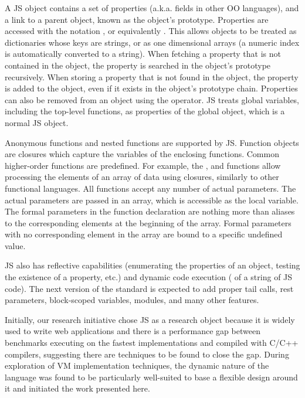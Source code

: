 A JS object contains a set of properties (a.k.a. fields in other OO languages),
and a link to a parent object, known as the object's prototype. Properties are
accessed with the notation , or equivalently .
This allows objects to be treated as dictionaries whose keys are strings, or as
one dimensional arrays (a numeric index is automatically converted to a
string).  When fetching a property that is not contained in the object, the
property is searched in the object's prototype recursively. When storing a
property that is not found in the object, the property is added to the object,
even if it exists in the object’s prototype chain. Properties can also be
removed from an object using the  operator. JS treats global
variables, including the top-level functions, as properties of the global
object, which is a normal JS object.

Anonymous functions and nested functions are supported by JS. Function objects
are closures which capture the variables of the enclosing functions. Common
higher-order functions are predefined. For example, the , 
and  functions allow processing the elements of an array of data
using closures, similarly to other functional languages. All functions accept
any number of actual parameters. The actual parameters are passed in an array,
which is accessible as the  local variable. The formal parameters
in the function declaration are nothing more than aliases to the corresponding
elements at the beginning of the array. Formal parameters with no corresponding
element in the array are bound to a specific undefined value.

JS also has reflective capabilities (enumerating the properties of an object,
testing the existence of a property, etc.) and dynamic code execution
( of a string of JS code).  The next version of the standard is
expected to add proper tail calls, rest parameters, block-scoped variables,
modules, and many other features.

Initially, our research initiative chose JS as a research object because it is
widely used to write web applications and there is a performance gap between
benchmarks executing on the fastest implementations and compiled with C/C++
compilers, suggesting there are techniques to be found to close the gap.
During exploration of VM implementation techniques, the dynamic nature of the
language was found to be particularly well-suited to base a flexible design
around it and initiated the work presented here.

